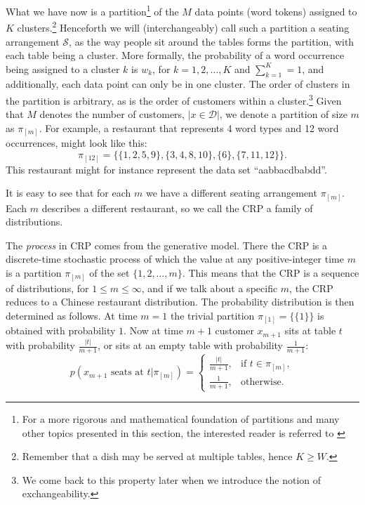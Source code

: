 What we have now is a partition\footnote{For a more rigorous and mathematical foundation of partitions and many other topics presented in this section, the interested reader is referred to \cite{Pitman2006Combinatorial}} of the $M$ data points (word tokens) assigned to $K$ clusters.\footnote{Remember that a dish may be served at multiple tables, hence $K\geq W$.} Henceforth we will (interchangeably) call such a partition a seating arrangement $\mathcal{S}$, as the way people sit around the tables forms the partition, with each table being a cluster. More formally, the probability of a word occurrence being assigned to a cluster $k$ is $w_k$, for $k = 1, 2, \ldots, K$ and $\sum_{k=1}^K = 1$, and additionally, each data point can only be in one cluster. The order of clusters in the partition is arbitrary, as is the order of customers within a cluster.\footnote{We come back to this property later when we introduce the notion of exchangeability.} Given that $M$ denotes the number of customers, $|x\in\mathcal{D}|$, we denote a partition of size $m$ as $\pi_{[m]}$. %
%
%
For example, a restaurant that represents 4 word types and 12 word occurrences, might look like this: 
\begin{equation}\label{eq:partitionexample}
	\pi_{[12]} = \{\{1,2,5,9\},\{3,4,8,10\},\{6\},\{7,11,12\}\}.
\end{equation}
This restaurant might for instance represent the data set ``aabbacdbabdd''. 

It is easy to see that for each $m$ we have a different seating arrangement $\pi_{[m]}$. Each $m$ describes a different restaurant, so we call the CRP a family of distributions.

The \emph{process}\/ in CRP comes from the generative model. There the CRP is a discrete-time stochastic process of which the value at any positive-integer time $m$ is a partition $\pi_{[m]}$ of the set $\{1,2,\ldots,m\}$. This means that the CRP is a sequence of distributions, for $1\leq m \leq\infty$, and if we talk about a specific $m$, the CRP reduces to a Chinese restaurant distribution. The probability distribution is then determined as follows. At time $m=1$ the trivial partition $\pi_{[1]}=\{\{1\}\}$ is obtained with probability $1$. 
Now at time $m+1$ customer $x_{m+1}$ sits at table $t$ with probability $\frac{|t|}{m+1}$, or sits at an empty table with probability $\frac{1}{m+1}$: 
\begin{equation}\label{eq:crp-table}
	p(x_{m+1}\text{ seats at }t|\pi_{[m]}) = 
    \begin{cases}
    	\frac{|t|}{m+1}, & \text{if }t\in\pi_{[m]},\\
    	\frac{1}{m+1}, & \text{otherwise}.
  	\end{cases}
\end{equation}

